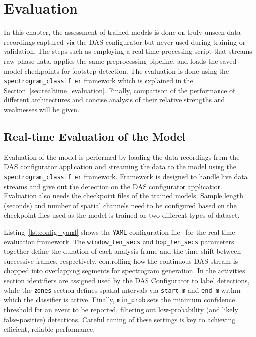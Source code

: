 
\chapter{Evaluation}
\label{ch:evaluation}

In this chapter, the assessment of trained models is done on truly unseen data-recordings captured via the DAS configurator but never used during training or validation. The steps such as employing a real-time processing script that streams raw phase data, applies the same preprocessing pipeline, and loads the saved model checkpoints for footstep detection. The evaluation is done using the \texttt{spectrogram\_classifier} framework which is explained in the Section~\ref{sec:realtime_evaluation}. Finally, comparison of the performance of different architectures and concise analysis of their relative strengths and weaknesses will be given.

\section{Real-time Evaluation of the  Model}

Evaluation of the model is performed by loading the data recordings from the DAS configurator application and streaming the data to the model using the \texttt{spectrogram\_classifier} framework. Framework is designed to handle live data streams and give out the detection on the DAS configurator application. Evaluation also needs the checkpoint files of the trained models. Sample length (seconds) and number of spatial channels need to be configured based on the checkpoint files used as the model is trained on two different types of dataset. 

Listing~\ref{lst:config_yaml} shows the \texttt{YAML} configuration file~\cite{pyyaml} for the real-time evaluation framework. The \texttt{window\_len\_secs} and \texttt{hop\_len\_secs} parameters together define the duration of each analysis frame and the time shift between successive frames, respectively, controlling how the continuous DAS stream is chopped into overlapping segments for spectrogram generation. In the activities section identifiers are assigned used by the DAS Configurator to label detections, while the \texttt{zones} section defines spatial intervals via \texttt{start\_m} and \texttt{end\_m} within which the classifier is active. Finally, \texttt{min\_prob} sets the minimum confidence threshold for an event to be reported, filtering out low-probability (and likely false-positive) detections. Careful tuning of these settings is key to achieving efficient, reliable performance.

